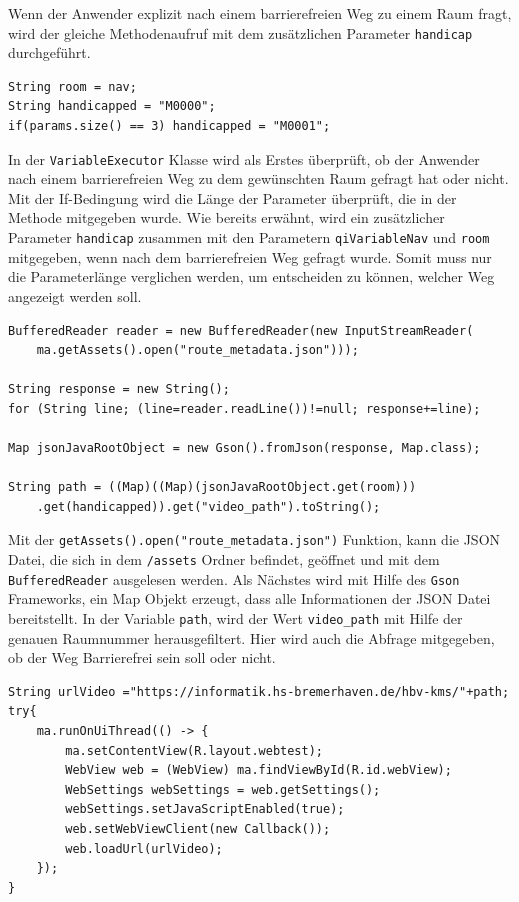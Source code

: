 Wenn der Anwender explizit nach einem barrierefreien Weg zu einem Raum fragt, wird der gleiche Methodenaufruf mit dem zusätzlichen 
Parameter \verb|handicap| durchgeführt.\\

\begin{lstlisting}
String room = nav;
String handicapped = "M0000";
if(params.size() == 3) handicapped = "M0001";
\end{lstlisting}


In der \verb|VariableExecutor| Klasse wird als Erstes überprüft, ob der Anwender nach einem barrierefreien Weg zu dem gewünschten Raum 
gefragt hat oder nicht. Mit der If-Bedingung wird die Länge der Parameter überprüft, die in der Methode mitgegeben wurde. 
Wie bereits erwähnt, wird ein zusätzlicher Parameter \verb|handicap| zusammen mit den Parametern \verb|qiVariableNav|
und \verb|room| mitgegeben, wenn nach dem barrierefreien Weg gefragt wurde. Somit muss nur die Parameterlänge verglichen 
werden, um entscheiden zu können, welcher Weg angezeigt werden soll.\\

\begin{lstlisting}
BufferedReader reader = new BufferedReader(new InputStreamReader(
    ma.getAssets().open("route_metadata.json")));

String response = new String();
for (String line; (line=reader.readLine())!=null; response+=line);

Map jsonJavaRootObject = new Gson().fromJson(response, Map.class);

String path = ((Map)((Map)(jsonJavaRootObject.get(room)))
    .get(handicapped)).get("video_path").toString();
\end{lstlisting}

Mit der \verb|getAssets().open("route_metadata.json")| Funktion, kann die JSON Datei, die sich in dem \verb|/assets|
Ordner befindet, geöffnet und mit dem \verb|BufferedReader| ausgelesen werden. Als Nächstes wird mit Hilfe des \verb|Gson| Frameworks, 
ein Map Objekt erzeugt, dass alle Informationen der JSON Datei bereitstellt. In der Variable \verb|path|, wird der Wert 
\verb|video_path| mit Hilfe der genauen Raumnummer herausgefiltert. Hier wird auch die Abfrage mitgegeben, ob der Weg 
Barrierefrei sein soll oder nicht.\\


\begin{lstlisting}
String urlVideo ="https://informatik.hs-bremerhaven.de/hbv-kms/"+path;
try{
    ma.runOnUiThread(() -> {
        ma.setContentView(R.layout.webtest);
        WebView web = (WebView) ma.findViewById(R.id.webView);
        WebSettings webSettings = web.getSettings();
        webSettings.setJavaScriptEnabled(true);
        web.setWebViewClient(new Callback());
        web.loadUrl(urlVideo);
    });
}
\end{lstlisting}


